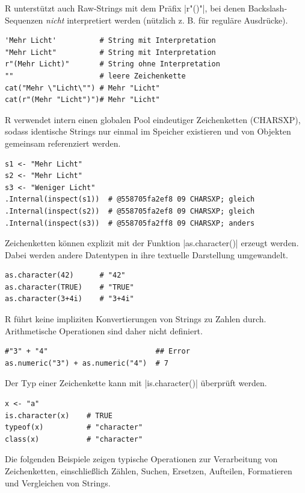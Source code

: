 \documentclass[10pt,twocolumn]{scrartcl}
\renewcommand{\lstinline}{\mycoloredinline}
\begin{document}
R unterstützt auch Raw-Strings mit dem Präfix \lstinline|r"()"|, bei denen Backslash-Sequenzen \emph{nicht} interpretiert werden (nützlich z. B. für reguläre Ausdrücke).

\begin{lstlisting}
'Mehr Licht'          # String mit Interpretation
"Mehr Licht"          # String mit Interpretation
r"(Mehr Licht)"       # String ohne Interpretation
""                    # leere Zeichenkette
cat("Mehr \"Licht\"") # Mehr "Licht"
cat(r"(Mehr "Licht")")# Mehr "Licht"
\end{lstlisting}

R verwendet intern einen globalen Pool eindeutiger Zeichenketten (CHARSXP), sodass identische Strings nur einmal im Speicher existieren und von Objekten gemeinsam referenziert werden.

\begin{lstlisting}
s1 <- "Mehr Licht"
s2 <- "Mehr Licht"
s3 <- "Weniger Licht"
.Internal(inspect(s1))  # @558705fa2ef8 09 CHARSXP; gleich
.Internal(inspect(s2))  # @558705fa2ef8 09 CHARSXP; gleich
.Internal(inspect(s3))  # @558705fa2ff8 09 CHARSXP; anders
\end{lstlisting}

Zeichenketten können explizit mit der Funktion \lstinline|as.character()| erzeugt werden. Dabei werden andere Datentypen in ihre textuelle Darstellung umgewandelt.

\begin{lstlisting}
as.character(42)      # "42"
as.character(TRUE)    # "TRUE"
as.character(3+4i)    # "3+4i"
\end{lstlisting}

R führt keine impliziten Konvertierungen von Strings zu Zahlen durch. Arithmetische Operationen sind daher nicht definiert.

\begin{lstlisting}
#"3" + "4"                         ## Error
as.numeric("3") + as.numeric("4")  # 7
\end{lstlisting}

Der Typ einer Zeichenkette kann mit \lstinline|is.character()| überprüft werden.

\begin{lstlisting}
x <- "a"
is.character(x)    # TRUE
typeof(x)          # "character"
class(x)           # "character"
\end{lstlisting}

Die folgenden Beispiele zeigen typische Operationen zur Verarbeitung von Zeichenketten, einschließlich Zählen, Suchen, Ersetzen, Aufteilen, Formatieren und Vergleichen von Strings.
\end{document}
